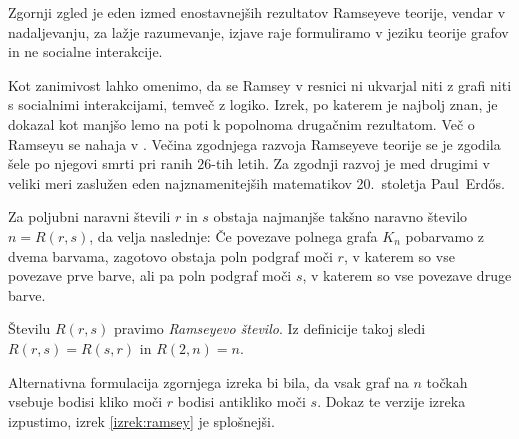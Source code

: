 \documentclass[twoside,11pt]{article}
\begin{document}
Zgornji zgled je eden izmed enostavnejših rezultatov Ramseyeve teorije, vendar v nadaljevanju,
za lažje razumevanje, izjave raje formuliramo v jeziku teorije grafov in ne socialne interakcije.

Kot zanimivost lahko omenimo, da se Ramsey v 
resnici ni ukvarjal niti z grafi niti s socialnimi interakcijami, temveč z logiko. Izrek, po katerem 
je najbolj znan, je dokazal kot manjšo lemo na poti k popolnoma drugačnim rezultatom. Več 
o Ramseyu se nahaja v \cite[poglavje 30]{color}. Večina zgodnjega razvoja 
Ramseyeve teorije se je zgodila šele po njegovi smrti pri ranih $26$-tih letih. Za zgodnji razvoj je 
med drugimi v veliki meri zaslužen eden najznamenitejših matematikov 20.~stoletja 
Paul~Erdős.

\begin{izrek}[Ramsey] \label{izrek:ramseyosnovni}
    Za poljubni naravni števili $r$ in $s$ obstaja najmanjše takšno naravno število 
    $n = R(r,s)$, da velja naslednje: Če povezave polnega grafa $K_n$ pobarvamo z dvema barvama, 
    zagotovo obstaja poln podgraf moči $r$, v katerem so vse povezave prve barve, ali pa poln 
    podgraf moči $s$, v katerem so vse povezave druge barve.
\end{izrek}

Številu $R(r, s)$ pravimo \emph{Ramseyevo število}.
Iz definicije takoj sledi $R(r, s) = R(s, r)$ in $R(2, n) = n$.


Alternativna formulacija zgornjega izreka bi bila, da vsak graf na $n$ točkah vsebuje 
bodisi kliko moči $r$ bodisi antikliko moči $s$.
Dokaz te verzije izreka izpustimo, izrek \ref{izrek:ramsey} je splošnejši.
\end{document}
